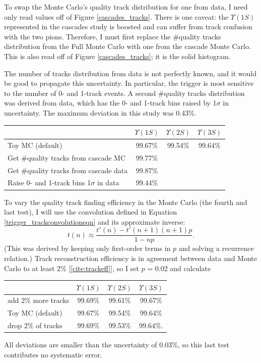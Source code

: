 To swap the Monte Carlo's quality track distribution for one from
data, I need only read values off of Figure \ref{cascades_tracks}.
There is one caveat: the $\Upsilon(1S)$ represented in the cascades
study is boosted and can suffer from track confusion with the two
pions.  Therefore, I must first replace the \#quality tracks
distribution from the Full Monte Carlo with one from the cascade Monte
Carlo.  This is also read off of Figure \ref{cascades_tracks}; it is
the solid histogram.

The number of tracks distribution from data is not perfectly known,
and it would be good to propagate this uncertainty.  In particular,
the trigger is most sensitive to the number of 0- and 1-track events.
A second \#quality tracks distribution was derived from data, which
has the 0- and 1-track bins raised by 1$\sigma$ in uncertainty.  The
maximum deviation in this study was 0.43\%.
\begin{center}
  \begin{tabular}{l c c c}
    & $\Upsilon(1S)$ & $\Upsilon(2S)$ & $\Upsilon(3S)$ \\\hline
    Toy MC (default) & 99.67\% & 99.54\% & 99.64\% \\
    Get \#quality tracks from cascade MC & 99.77\% & & \\
    Get \#quality tracks from cascade data & 99.87\% & & \\
    Raise 0- and 1-track bins 1$\sigma$ in data & 99.44\% & & \\
  \end{tabular}
\end{center}

To vary the quality track finding efficiency in the Monte Carlo (the
fourth and last test), I will use the convolution defined in Equation
\ref{trigger_trackconvolutioneqn} and its approximate inverse:
\begin{equation}
  t(n) \approx \frac{t'(n) - t'(n+1)(n+1)p}{1 - np}\mbox{.}
\end{equation}
(This was derived by keeping only first-order terms in $p$ and solving
a recurrence relation.)  Track reconstruction efficiency is in
agreement between data and Monte Carlo to at least 2\%
[\ref{cite:trackeff}], so I set $p$ = 0.02 and calculate
\begin{center}
  \begin{tabular}{l c c c}
    & $\Upsilon(1S)$ & $\Upsilon(2S)$ & $\Upsilon(3S)$ \\\hline
    add 2\% more tracks & 99.69\% & 99.61\% & 99.67\% \\
    Toy MC (default) & 99.67\% & 99.54\% & 99.64\% \\
    drop 2\% of tracks & 99.69\% & 99.53\% & 99.64\%.
  \end{tabular}
\end{center}
All deviations are smaller than the uncertainty of 0.03\%, so this
last test contributes no systematic error.

